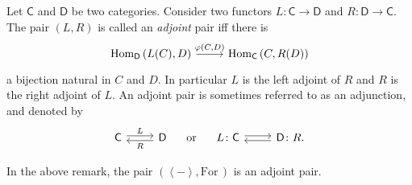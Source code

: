 \begin{defn}
	Let $\mathsf{C}$ and $\mathsf{D}$ be two categories.
	Consider two functors $L: \mathsf{C} \to \mathsf{D}$ and $R: \mathsf{D} \to \mathsf{C}$.
	The pair $\left(L, R\right)$ is called an {\em adjoint} pair iff there is
	\begin{equation}
	\begin{tikzcd}
		\mathrm{Hom}_{\mathsf{D}} \left( L(C), D \right) \arrow[r, "{\varphi(C,D)}", rightarrow] &
		\mathrm{Hom}_{\mathsf{C}} \left( C, R(D) \right)
	\end{tikzcd}
	\end{equation} 
	a bijection natural in $C$ and $D$.
	In particular $L$ is the left adjoint of $R$ and $R$ is the right adjoint of $L$.
	An adjoint pair is sometimes referred to as an adjunction, and denoted by
	\begin{equation}
	\begin{tikzcd}
		\mathsf{C} \arrow[r, "L", rightarrow, shift left = .5ex] &
		\mathsf{D} \arrow[l, "R", rightarrow, shift left = .5ex] 
	\end{tikzcd}
	\quad\text{ or }\quad
	\begin{tikzcd}
		L\colon\mathsf{C} \arrow[r, "", rightarrow, shift left = .5ex] &
		\mathsf{D}\colon R \arrow[l, "", rightarrow, shift left = .5ex] 
	.\end{tikzcd}
	\end{equation} 
\end{defn}

\begin{rem}
	In the above remark, the pair $\left(\left\langle - \right\rangle, \mathrm{For}\, \right)$ is an adjoint pair.
\end{rem} 

